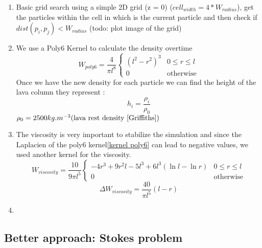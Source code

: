 \documentclass{article}
\begin{document}
\begin{enumerate}
    \item Basic grid search using a simple 2D grid (z = 0) (${cell}_{width} = 4*W_{radius}$), get the particles within the cell in which is the current particle and then check if $dist(p_i, p_j) < W_{radius}$ (todo: plot image of the grid)\\

    \item We use a Poly6 Kernel\cite{Solenthaler2011SPHBS} to calculate the density overtime
\begin{equation}\label{kernel poly6}
    W_{poly6} = \frac{4}{\pi l^8}
        \begin{cases} 
            (l^2 - r^2)^3 & 0 \leq r \leq l           
            \\ 0 & \text{otherwise} 
        \end{cases} 
\end{equation}
Once we have the new density for each particle we can find the height of the lava column they represent :
\begin{equation}\label{calcul height}
    h_i = \frac{\rho_i}{\rho_0}
\end{equation}
$\rho_0 = 2500 kg.m^{-3} \text{(lava rest density \cite{Griffiths})}$

    \item The viscosity is very important to stabilize the simulation and since the Laplacien of the poly6 kernel\ref{kernel poly6} can lead to negative values, we used another kernel\cite{Solenthaler2011SPHBS} for the viscosity.
\begin{equation}\label{kernel viscosity}
    W_{viscosity} = \frac{10}{9 \pi l^5}
        \begin{cases} 
            -4r^3 + 9r^2l - 5l^3 + 6l^3(\ln{l} - \ln{r}) & 0 \leq r \leq l           
            \\ 0 & \text{otherwise} 
        \end{cases} 
\end{equation}
\begin{equation}\label{kernel viscosity laplacien}
    \Delta W_{viscosity} = \frac{40}{\pi l^5}(l-r)
\end{equation}

    \item 

\end{enumerate}

\subsection*{Better approach: Stokes problem}
\end{document}

